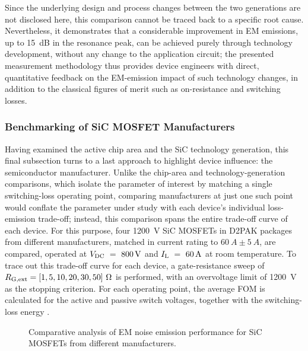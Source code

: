 Since the underlying design and process changes between the two generations are not disclosed here, this comparison cannot be traced back to a specific root cause.
Nevertheless, it demonstrates that a considerable improvement in EM emissions, up to \SI{15}{dB} in the resonance peak, can be achieved purely through technology development, without any change to the application circuit; the presented measurement methodology thus provides device engineers with direct, quantitative feedback on the EM-emission impact of such technology changes, in addition to the classical figures of merit such as on-resistance and switching losses.

\FloatBarrier


\subsubsection*{Benchmarking of SiC MOSFET Manufacturers}
\label{sec:benchmark}
Having examined the active chip area and the SiC technology generation, this final subsection turns to a last approach to highlight device influence: the semiconductor manufacturer.
Unlike the chip-area and technology-generation comparisons, which isolate the parameter of interest by matching a single switching-loss operating point, comparing manufacturers at just one such point would conflate the parameter under study with each device's individual loss-emission trade-off; instead, this comparison spans the entire trade-off curve of each device.
For this purpose, four \SI{1200}{V} SiC MOSFETs in D2PAK packages from different manufacturers, matched in current rating to $\SI{60}{A}\pm\SI{5}{A}$, are compared, operated at ${V}_{\mathrm{DC}}~=~\SI{800}{V}$ and ${I}_{\mathrm{L}}~=~\SI{60}{A}$ at room temperature.
To trace out this trade-off curve for each device, a gate-resistance sweep of ${R}_{\mathrm{G,ext}} = [1, 5, 10, 20, 30, 50]~\si{\ohm}$ is performed, with an overvoltage limit of \SI{1200}{V} as the stopping criterion.
For each operating point, the average FOM is calculated for the active and passive switch voltages, together with the switching-loss energy .

\begin{figure}[h]
	\centering
	
	\caption{Comparative analysis of EM noise emission performance for SiC MOSFETs from different manufacturers.}
	\label{fig:MR_CompetitorAnalysis}
\end{figure}

